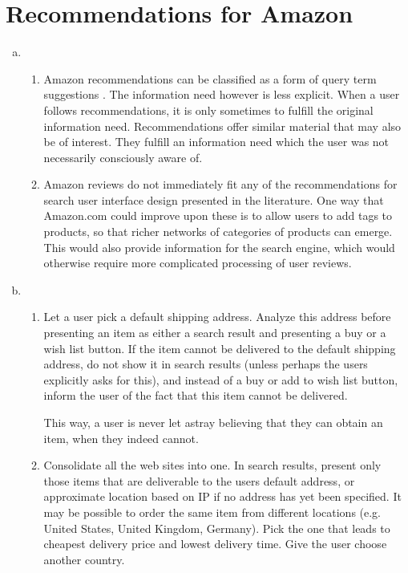 
\section{Recommendations for Amazon}

\begin{enumerate}[a.]

\item

\begin{enumerate}[1.]

\item Amazon recommendations can be classified as a form of query term
suggestions \cite[\textsection\ 1.5.4]{hearst}. The information need however is
less explicit. When a user follows recommendations, it is only sometimes to
fulfill the original information need. Recommendations offer similar material
that may also be of interest. They fulfill an information need which the user
was not necessarily consciously aware of.

\item Amazon reviews do not immediately fit any of the recommendations for
search user interface design presented in the literature. One way that
Amazon.com could improve upon these is to allow users to add tags to products,
so that richer networks of categories of products can emerge. This would also
provide information for the search engine, which would otherwise require more
complicated processing of user reviews.

\end{enumerate}

\item

\begin{enumerate}[1.]

\item Let a user pick a default shipping address. Analyze this address before
presenting an item as either a search result and presenting a buy or a wish
list button. If the item cannot be delivered to the default shipping address,
do not show it in search results (unless perhaps the users explicitly asks for
this), and instead of a buy or add to wish list button, inform the user of the
fact that this item cannot be delivered.

This way, a user is never let astray believing that they can obtain an item,
when they indeed cannot.

\item Consolidate all the web sites into one. In search results, present only
those items that are deliverable to the users default address, or approximate
location based on IP if no address has yet been specified. It may be possible
to order the same item from different locations (e.g. United States, United
Kingdom, Germany). Pick the one that leads to cheapest delivery price and
lowest delivery time. Give the user choose another country.


\end{enumerate}
\end{enumerate}
